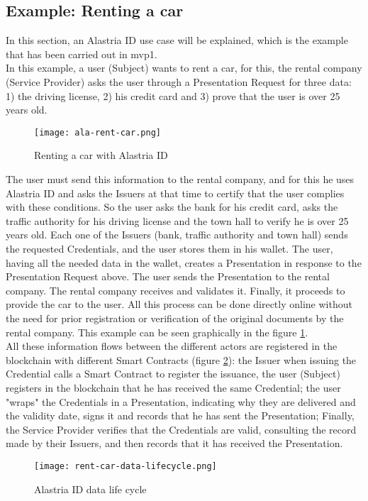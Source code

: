\subsection{Example: Renting a car}
In this section, an Alastria ID use case will be explained, which is the example that has been carried out in \acrshort{mvp}1\cite{mvp1-car}.\\

In this example, a user (Subject) wants to rent a car, for this, the rental company (Service Provider) asks the user through a Presentation Request for three data: 1) the driving license, 2) his credit card and 3) prove that the user is over 25 years old.
\begin{figure}[h]
    \centering
    \texttt{[image: ala-rent-car.png]}
    \caption{Renting a car with Alastria ID}
    \label{fig:ex-car}
\end{figure}
The user must send this information to the rental company, and for this he uses Alastria ID and asks the Issuers at that time to certify that the user complies with these conditions. So the user asks the bank for his credit card, asks the traffic authority for his driving license and the town hall to verify he is over 25 years old. Each one of the Issuers (bank, traffic authority and town hall) sends the requested Credentials, and the user stores them in his wallet. The user, having all the needed data in the wallet, creates a Presentation in response to the Presentation Request above. The user sends the Presentation to the rental company. The rental company receives and validates it. Finally, it proceeds to provide the car to the user. All this process can be done directly online without the need for prior registration or verification of the original documents by the rental company. This example can be seen graphically in the figure \ref{fig:ex-car}.\\

All these information flows between the different actors are registered in the blockchain with different Smart Contracts (figure \ref{fig:rent-cycle}): the Issuer when issuing the Credential calls a Smart Contract to register the issuance, the user (Subject) registers in the blockchain that he has received the same Credential; the user "wraps" the Credentials in a Presentation, indicating why they are delivered and the validity date, signs it and records that he has sent the Presentation; Finally, the Service Provider verifies that the Credentials are valid, consulting the record made by their Issuers, and then records that it has received the Presentation.
\begin{figure}[h]
    \centering
    \texttt{[image: rent-car-data-lifecycle.png]}
    \caption{Alastria ID data life cycle}
    \label{fig:rent-cycle}
\end{figure}

